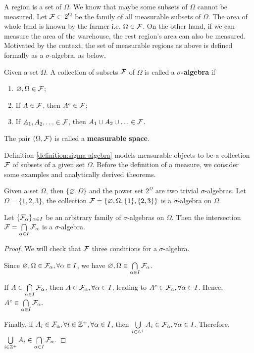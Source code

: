 A region is a set of $\Omega$. We know that maybe some subsets of $\Omega$ cannot be measured. Let $\mathcal{F}\subset2^\Omega$ be the family of all measurable subsets of $\Omega$. The area of whole land is known by the farmer i.e. $\Omega\in\mathcal{F}$. On the other hand, if we can measure the area of the warehouse, the rest region's area can also be measured. Motivated by the context, the set of measurable regions as above is defined formally as a $\sigma$-algebra, as below.

\begin{definition}
 \label{definition:sigma-algebra}
 Given a set $\Omega$. A collection of subsets $\mathcal{F}$ of $\Omega$ is called a \textbf{$\sigma$-algebra} if
 \begin{enumerate}
  \item $\varnothing, \Omega\in\mathcal{F}$;
  \item If $A\in\mathcal{F}$, then $A^c\in\mathcal{F}$;
  \item If $A_1,A_2,\ldots\in\mathcal{F}$, then $A_1\cup A_2\cup\ldots\in\mathcal{F}$.
 \end{enumerate}
 The pair $(\Omega, \mathcal{F})$ is called a \textbf{measurable space}.
\end{definition}

Definition \ref{definition:sigma-algebra} models measurable objects to be a collection $\mathcal{F}$ of subsets of a given set $\Omega$. Before the definition of a measure, we consider some examples and analytically derived theorems.

\begin{example}
 \label{example:1}
 Given a set $\Omega$, then $\{\varnothing, \Omega\}$ and the power set $2^\Omega$ are two trivial $\sigma$-algebras. Let $\Omega=\{1,2,3\}$, the collection $\mathcal{F}=\{\varnothing,\Omega, \{1\}, \{2,3\}\}$ is a $\sigma$-algebra on $\Omega$.
\end{example}

\begin{proposition}
 Let $\{\mathcal{F}_\alpha\}_{\alpha\in I}$ be an arbitrary family of $\sigma$-algebras on $\Omega$. Then the intersection $\mathcal{F}=\bigcap\limits_{\alpha\in I}\mathcal{F}_\alpha$ is a $\sigma$-algebra.
\end{proposition}

\begin{proof}
 We will check that $\mathcal{F}$ three conditions for a $\sigma$-algebra.

 Since $\varnothing,\Omega\in\mathcal{F}_\alpha,\forall\alpha\in I$, we have $\varnothing,\Omega\in\bigcap\limits_{\alpha\in I}\mathcal{F}_\alpha$.

 If $A\in\bigcap\limits_{\alpha\in I}\mathcal{F}_\alpha$, then $A\in \mathcal{F}_\alpha,\forall\alpha\in I$, leading to $A^c\in \mathcal{F}_\alpha,\forall\alpha\in I$. Hence, $A^c\in\bigcap\limits_{\alpha\in I}\mathcal{F}_\alpha.$

 Finally, if $A_i\in\mathcal{F}_\alpha,\forall i\in\mathbb{Z}^+,\forall \alpha\in I$, then $\bigcup\limits_{i\in\mathbb{Z}^+}A_i\in\mathcal{F}_\alpha,\forall\alpha\in I$. Therefore,
 $\bigcup\limits_{i\in\mathbb{Z}^+}A_i\in\bigcap\limits_{\alpha\in I}\mathcal{F}_\alpha.$
\end{proof}

